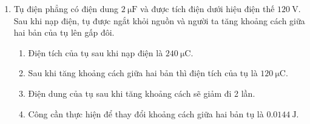 \begin{enumerate}[label=\bfseries Câu \arabic*:]
 \item Tụ điện phẳng có điện dung $\SI{2}{\micro\farad}$ và được tích điện dưới hiệu điện thế $\SI{120}{\volt}$. Sau khi nạp điện, tụ được ngắt khỏi nguồn và người ta tăng khoảng cách giữa hai bản của tụ lên gấp đôi.
 \begin{enumerate}[label=\bfseries \alph*)]
 	\item Điện tích của tụ sau khi nạp điện là $\SI{240}{\micro\coulomb}$.
 	\item Sau khi tăng khoảng cách giữa hai bản thì điện tích của tụ là $\SI{120}{\micro\coulomb}$.
 	\item Điện dung của tụ sau khi tăng khoảng cách sẽ giảm đi 2 lần.
 	\item Công cần thực hiện để thay đổi khoảng cách giữa hai bản tụ là $\SI{0.0144}{\joule}$.
 \end{enumerate}


\end{enumerate}

